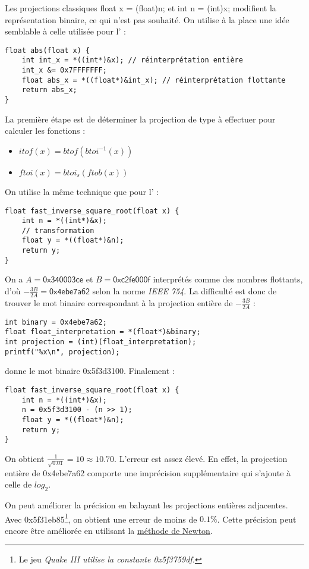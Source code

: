\documentclass[../main.tex]{subfiles}
\begin{document}
Les projections classiques \textsf{float x = (float)n;} et \textsf{int n = (int)x;} modifient la représentation binaire, ce qui n'est pas souhaité. On utilise à la place une idée semblable à celle utilisée pour l' :
\begin{verbatim}
float abs(float x) {
	int int_x = *((int*)&x); // réinterprétation entière
	int_x &= 0x7FFFFFFF;	
	float abs_x = *((float*)&int_x); // réinterprétation flottante
	return abs_x;
}
\end{verbatim}
La première étape est de déterminer la projection de type à effectuer pour calculer les fonctions :
\begin{itemize}
	\item $itof(x) = btof(btoi^{-1}(x))$
	\item $ftoi(x) = btoi_s(ftob(x))$
\end{itemize}
On utilise la même technique que pour l' :
\begin{verbatim}
float fast_inverse_square_root(float x) {
	int n = *((int*)&x);
	// transformation
	float y = *((float*)&n);
	return y;
}
\end{verbatim}
On a $A = \textsf{0x340003ce}$ et $B = \textsf{0xc2fe000f}$ interprétés comme des nombres flottants, d'où $-\frac{3B}{2A} = \textsf{0x4ebe7a62}$ selon la norme \textit{IEEE 754}. La difficulté est donc de trouver le mot binaire correspondant à la projection entière de $-\frac{3B}{2A}$ :
\begin{verbatim}
int binary = 0x4ebe7a62;
float float_interpretation = *(float*)&binary;
int projection = (int)(float_interpretation);
printf("%x\n", projection);
\end{verbatim}
donne le mot binaire \textsf{0x5f3d3100}. Finalement :
\begin{verbatim}
float fast_inverse_square_root(float x) {
	int n = *((int*)&x);
	n = 0x5f3d3100 - (n >> 1);
	float y = *((float*)&n);
	return y;
}
\end{verbatim}
On obtient $\frac{1}{\sqrt{0.01}} = 10 \approx 10.70$. L'erreur est assez élevé. En effet, la projection entière de \textsf{0x4ebe7a62} comporte une imprécision supplémentaire qui s'ajoute à celle de $log_2$.

On peut améliorer la précision en balayant les projections entières adjacentes. Avec \textsf{0x5f31eb85}\footnote{Le jeu \textit{Quake III utilise la constante \textsf{0x5f3759df}.}}, on obtient une erreur de moins de $0.1\%$. Cette précision peut encore être améliorée en utilisant la \href{https://fr.wikipedia.org/wiki/M%C3%A9thode_de_Newton}{méthode de Newton}. 
\end{document}
